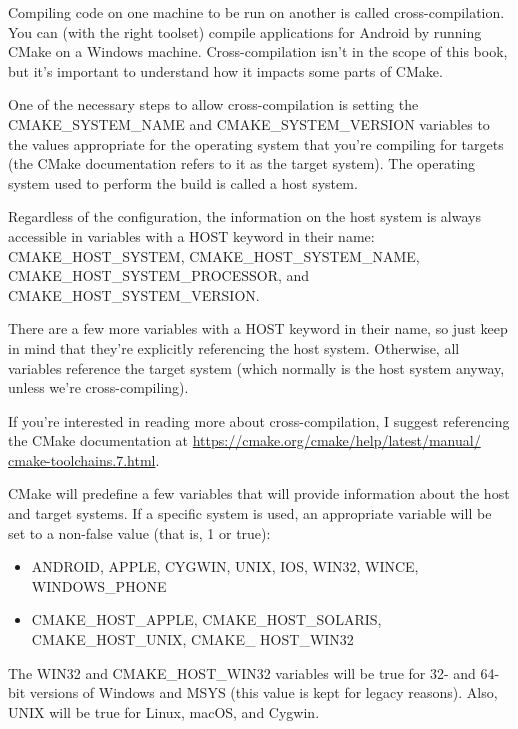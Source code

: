 
Compiling code on one machine to be run on another is called cross-compilation. You can (with the right toolset) compile applications for Android by running CMake on a Windows machine. Cross-compilation isn't in the scope of this book, but it's important to understand how it impacts some parts of CMake.

One of the necessary steps to allow cross-compilation is setting the CMAKE\_SYSTEM\_NAME and CMAKE\_SYSTEM\_VERSION variables to the values appropriate for the operating system that you're compiling for targets (the CMake documentation refers to it as the target system). The operating system used to perform the build is called a host system.

Regardless of the configuration, the information on the host system is always accessible in variables with a HOST keyword in their name: CMAKE\_HOST\_SYSTEM, CMAKE\_HOST\_SYSTEM\_NAME, CMAKE\_HOST\_SYSTEM\_PROCESSOR, and CMAKE\_HOST\_SYSTEM\_VERSION.

There are a few more variables with a HOST keyword in their name, so just keep in mind that they're explicitly referencing the host system. Otherwise, all variables reference the target system (which normally is the host system anyway, unless we're cross-compiling).

If you're interested in reading more about cross-compilation, I suggest referencing the CMake documentation at \url{https://cmake.org/cmake/help/latest/manual/ cmake-toolchains.7.html}.


CMake will predefine a few variables that will provide information about the host and target systems. If a specific system is used, an appropriate variable will be set to a non-false value (that is, 1 or true):

\begin{itemize}
\item 
ANDROID, APPLE, CYGWIN, UNIX, IOS, WIN32, WINCE, WINDOWS\_PHONE

\item 
CMAKE\_HOST\_APPLE, CMAKE\_HOST\_SOLARIS, CMAKE\_HOST\_UNIX, CMAKE\_
HOST\_WIN32
\end{itemize}

The WIN32 and CMAKE\_HOST\_WIN32 variables will be true for 32- and 64-bit versions of Windows and MSYS (this value is kept for legacy reasons). Also, UNIX will be true for Linux, macOS, and Cygwin.

